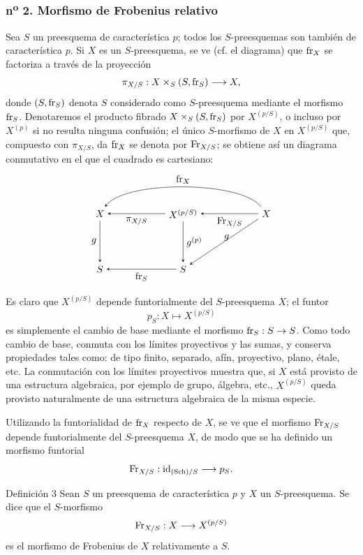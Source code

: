 \subsubsection*{n\textsuperscript{o} 2. Morfismo de Frobenius relativo}

Sea $S$ un preesquema de característica $p$; todos los $S$-preesquemas son también de característica $p$. Si $X$ es un $S$-preesquema, se ve (cf. el diagrama) que $\operatorname{fr}_X$ se factoriza a través de la proyección
\[
\pi_{X/S}:X\times_S(S,\operatorname{fr}_S)\longrightarrow X,
\]
donde $(S,\operatorname{fr}_S)$ denota $S$ considerado como $S$-preesquema mediante el morfismo $\operatorname{fr}_S$. Denotaremos el producto fibrado $X\times_S(S,\operatorname{fr}_S)$ por $X^{(p/S)}$, o incluso por $X^{(p)}$ si no resulta ninguna confusión; el único $S$-morfismo de $X$ en $X^{(p/S)}$ que, compuesto con $\pi_{X/S}$, da $\operatorname{fr}_X$ se denota por $\operatorname{Fr}_{X/S}$; se obtiene así un diagrama conmutativo en el que el cuadrado es cartesiano:
\[
\begin{tikzpicture}[baseline=(current bounding box.center),>=stealth]
\node (XL) at (0,2.0) {$X$};
\node (XM) at (3.0,2.0) {$X^{(p/S)}$};
\node (XR) at (6.0,2.0) {$X$};
\node (SL) at (0,0) {$S$};
\node (SM) at (3.0,0) {$S$};
\draw[->] (XM) -- node[below] {$\pi_{X/S}$} (XL);
\draw[->] (XR) -- node[below] {$\Fr_{X/S}$} (XM);
\draw[->] (XR) .. controls (5.1,3.2) and (0.9,3.2) .. node[above] {$\fr_X$} (XL);
\draw[->] (XL) -- node[left] {$g$} (SL);
\draw[->] (XM) -- node[right] {$g^{(p)}$} (SM);
\draw[->] (XR) -- node[pos=.55,above right] {$g$} (SM);
\draw[->] (SM) -- node[below] {$\fr_S$} (SL);
\end{tikzpicture}
\]

Es claro que $X^{(p/S)}$ depende funtorialmente del $S$-preesquema $X$; el funtor
\[
p_S:X\longmapsto X^{(p/S)}
\]
es simplemente el cambio de base mediante el morfismo $\operatorname{fr}_S:S\to S$. Como todo cambio de base, conmuta con los límites proyectivos y las sumas, y conserva propiedades tales como: de tipo finito, separado, afín, proyectivo, plano, étale, etc. La conmutación con los límites proyectivos muestra que, si $X$ está provisto de una estructura algebraica, por ejemplo de grupo, álgebra, etc., $X^{(p/S)}$ queda provisto naturalmente de una estructura algebraica de la misma especie.

Utilizando la funtorialidad de $\operatorname{fr}_X$ respecto de $X$, se ve que el morfismo $\operatorname{Fr}_{X/S}$ depende funtorialmente del $S$-preesquema $X$, de modo que se ha definido un morfismo funtorial
\[
\operatorname{Fr}_{X/S}:\operatorname{id}_{(\operatorname{Sch})/S}\longrightarrow p_S.
\]

\begin{statement}{Definición 3}
Sean $S$ un preesquema de característica $p$ y $X$ un $S$-preesquema. Se dice que el $S$-morfismo
\[
\operatorname{Fr}_{X/S}:X\longrightarrow X^{(p/S)}
\]
es el morfismo de Frobenius de $X$ relativamente a $S$.
\end{statement}
